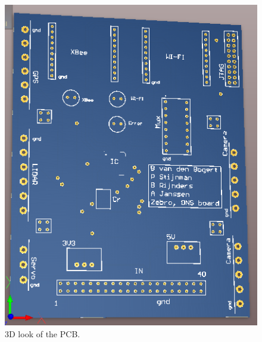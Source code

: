 \documentclass{article}
\begin{document}
\begin{figure}[H]
	\centering
	\includegraphics[scale=1]{figures/pcb3}
	\caption{3D look of the PCB. }
	\label{pcb3}
\end{figure}
\end{document}
